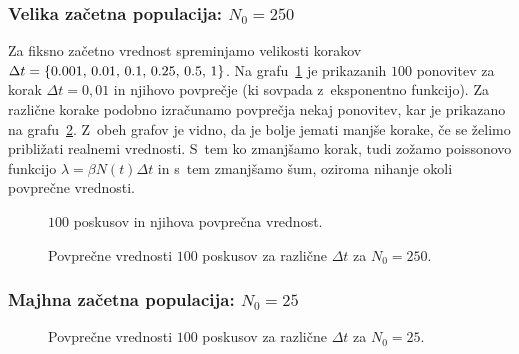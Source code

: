 \documentclass[a4paper,pdftex,11pt]{article}
\numberwithin{figure}{section} %
\begin{document}
\subsubsection*{Velika začetna populacija: $N_0=250$}
Za fiksno začetno vrednost spreminjamo velikosti korakov $\Delta t = \{ 0.001, \, 0.01, \\
\, 0.1, \, 0.25, \, 0.5, \, 1 \}$.
Na grafu~\ref{slika1} je prikazanih $100$ ponovitev za korak $\Delta t = 0,01$ in njihovo 
povprečje (ki sovpada z~eksponentno funkcijo). Za različne korake podobno izračunamo
povprečja nekaj ponovitev, kar je prikazano na grafu~\ref{slika2}. Z~obeh grafov je vidno, 
da je bolje jemati manjše korake, če se želimo približati realnemi vrednosti.
S~tem ko zmanjšamo korak, tudi zožamo poissonovo funkcijo $\lambda = \beta N(t) \Delta t$
in s~tem zmanjšamo šum, oziroma nihanje okoli povprečne vrednosti.
\begin{figure}    
    \centering
    \resizebox{0.75\linewidth}{!}{}
    \caption{$100$ poskusov in njihova povprečna vrednost.}
    \label{slika1}
\end{figure}

\begin{figure}    
    \begin{minipage}{\textwidth} 
	\centering 
	\resizebox{0.75\textwidth}{!}{} 
    \end{minipage}
    \begin{minipage}{\textwidth} 
	\centering
	\resizebox{0.75\textwidth}{!}{} 
    \end{minipage}

    \caption{Povprečne vrednosti $100$ poskusov za različne $\Delta t$ za $N_0=250$.}
    \label{slika2}
\end{figure}

\subsubsection*{Majhna začetna populacija: $N_0=25$}

\begin{figure}    
    \begin{minipage}{\textwidth} 
	\centering 
	\resizebox{0.75\textwidth}{!}{} 
    \end{minipage}
    \begin{minipage}{\textwidth} 
	\centering
	\resizebox{0.75\textwidth}{!}{} 
    \end{minipage}
    \caption{Povprečne vrednosti $100$ poskusov za različne $\Delta t$ za $N_0=25$.}
    \label{slika3}
\end{figure}
\end{document}
